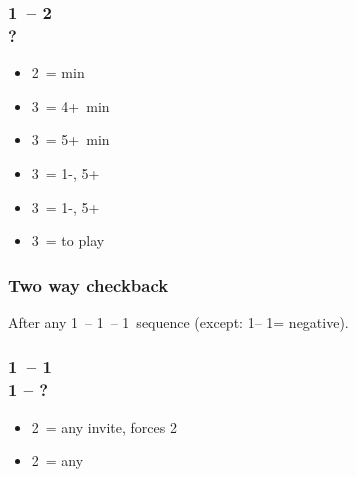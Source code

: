 \documentclass[12pt, a4paper]{article}
\begin{document}
\subsubsection*{1\diams\ -- 2\spades \\ ?}
\begin{itemize}
    \item 2\nt\ = \bal min
    \item 3\clubs\ = 4+\clubs\ min
    \item 3\diams\ = 5+\diams\ min
    \item 3\hearts\ = 1-\hearts, 5+\diams\ \gf
    \item 3\spades\ = 1-\spades, 5+\diams\ \gf
    \item 3\nt\ = to play
\end{itemize}

\subsubsection*{Two way checkback}

After any 1\ -- 1\ -- 1\ sequence (except:
1\clubs -- 1\diams = negative).

\subsubsection*{1\ -- 1 \\ 1 -- ?}
\begin{itemize}
    \item 2\clubs\ = any invite, forces 2\diams
    \item 2\diams\ = any \gf
\end{itemize}

\end{document}
